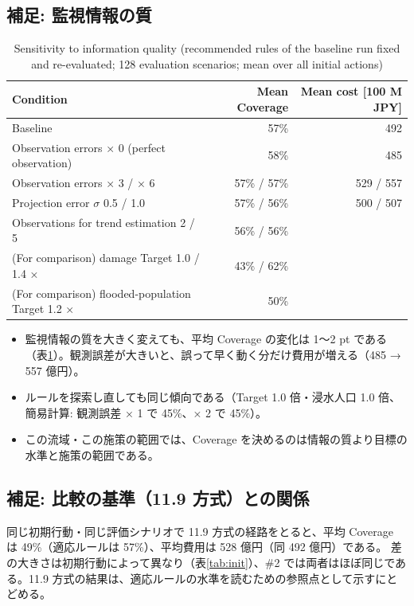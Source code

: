 \documentclass[a4paper,10pt]{ltjsarticle}
\begin{document}
\subsection{補足: 監視情報の質}
\begin{table}[H]
\centering\small
\caption{Sensitivity to information quality (recommended rules of the baseline run fixed and re-evaluated; 128 evaluation scenarios; mean over all initial actions)}
\label{tab:sens}
\begin{tabular}{@{}lrr@{}}
\toprule
Condition & Mean Coverage & Mean cost [100 M JPY] \\
\midrule
Baseline & 57\% & 492 \\
Observation errors × 0 (perfect observation) & 58\% & 485 \\
Observation errors × 3 / × 6 & 57\% / 57\% & 529 / 557 \\
Projection error $\sigma$ 0.5 / 1.0 & 57\% / 56\% & 500 / 507 \\
Observations for trend estimation 2 / 5 & 56\% / 56\% & \\
\midrule
(For comparison) damage Target 1.0 / 1.4 × & 43\% / 62\% & \\
(For comparison) flooded-population Target 1.2 × & 50\% & \\
\bottomrule
\end{tabular}
\end{table}
\begin{itemize}
  \item 監視情報の質を大きく変えても、平均 Coverage の変化は 1〜2 pt である（表\ref{tab:sens}）。観測誤差が大きいと、誤って早く動く分だけ費用が増える（485 → 557 億円）。
  \item ルールを探索し直しても同じ傾向である（Target 1.0 倍・浸水人口 1.0 倍、簡易計算: 観測誤差 × 1 で 45\%、× 2 で 45\%）。
  \item この流域・この施策の範囲では、Coverage を決めるのは情報の質より目標の水準と施策の範囲である。
\end{itemize}

\subsection{補足: 比較の基準（11.9 方式）との関係}
同じ初期行動・同じ評価シナリオで 11.9 方式の経路をとると、平均 Coverage は 49\%（適応ルールは 57\%）、平均費用は 528 億円（同 492 億円）である。
差の大きさは初期行動によって異なり（表\ref{tab:init}）、\#2 では両者はほぼ同じである。11.9 方式の結果は、適応ルールの水準を読むための参照点として示すにとどめる。
\end{document}
